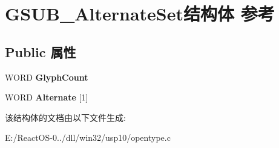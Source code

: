 \hypertarget{struct_g_s_u_b___alternate_set}{}\section{G\+S\+U\+B\+\_\+\+Alternate\+Set结构体 参考}
\label{struct_g_s_u_b___alternate_set}
\subsection*{Public 属性}
\begin{DoxyCompactItemize}
\item 
\mbox{\label{struct_g_s_u_b___alternate_set_ac49fe45f5e6b8326ebb6dd9079981627}} 
W\+O\+RD {\bfseries Glyph\+Count}
\item 
\mbox{\label{struct_g_s_u_b___alternate_set_a71d5015810d5b9476ccaefd8839fc11d}} 
W\+O\+RD {\bfseries Alternate} \mbox{[}1\mbox{]}
\end{DoxyCompactItemize}


该结构体的文档由以下文件生成\+:\begin{DoxyCompactItemize}
\item 
E\+:/\+React\+O\+S-\/0../dll/win32/usp10/opentype.\+c\end{DoxyCompactItemize}
